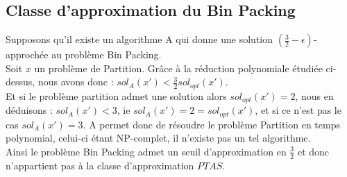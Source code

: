 \subsection{Classe d'approximation du Bin Packing}\label{ex10_q5}
Supposons qu'il existe un algorithme A qui donne une solution $(\frac{3}{2} -
\epsilon)$-approchée au problème Bin Packing.\\
Soit $x$ un problème de Partition.
Grâce à la réduction polynomiale étudiée ci-dessus, nous avons donc :
$sol_{A}(x') < \frac{3}{2}sol_{opt}(x')$.\\
Et si le problème partition admet une solution alors $sol_{opt}(x') = 2$, nous en
déduisons : $sol_{A}(x') < 3$, ie $sol_A(x') = 2 = sol_{opt}(x')$, et si ce n'est pas le
cas $sol_A(x') = 3$.
A permet donc de résoudre le problème Partition en temps polynomial, celui-ci étant
NP-complet, il n'existe pas un tel algorithme.\\
Ainsi le problème Bin Packing admet un seuil d'approximation en $\frac{3}{2}$ et donc 
n'appartient pas à la classe d'approximation $PTAS$.


